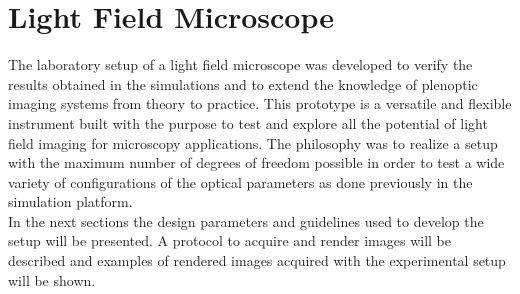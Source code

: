 \chapter{Light Field Microscope}
\label{chap:microscope}
The laboratory setup of a light field microscope was developed to verify the results obtained in the simulations and to extend the knowledge of plenoptic imaging systems from theory to practice. This prototype is a versatile and flexible instrument built with the purpose to test and explore all the potential of light field imaging for microscopy applications. The philosophy was to realize a setup with the maximum number of degrees of freedom possible in order to test a wide variety of configurations of the optical parameters as done previously in the simulation platform.\\
 In the next sections the design parameters and guidelines used to develop the setup will be presented. A protocol to acquire and render images will be described and examples of rendered images acquired with the experimental setup will be shown. 
